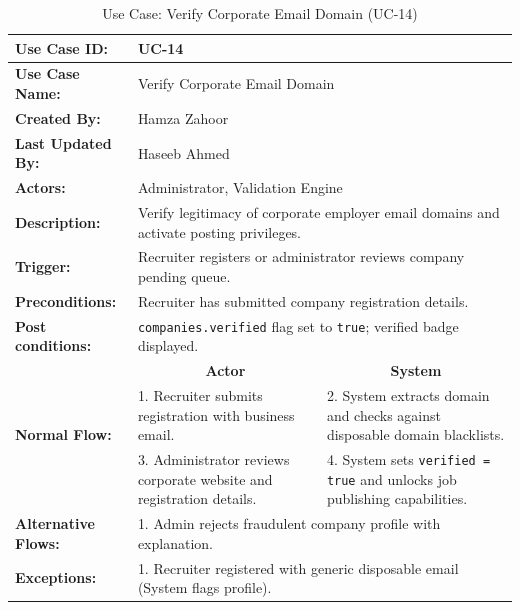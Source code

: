 \begin{table}[H]
\centering
\small
\caption{Use Case: Verify Corporate Email Domain (UC-14)}
\label{tab:uc14_spec}
\begin{tabular}{|p{3.2cm}|p{5.5cm}|p{5.5cm}|}
\hline
\textbf{Use Case ID:} & \multicolumn{2}{p{11.4cm}|}{UC-14} \\ \hline
\textbf{Use Case Name:} & \multicolumn{2}{p{11.4cm}|}{Verify Corporate Email Domain} \\ \hline
\textbf{Created By:} & \multicolumn{2}{p{11.4cm}|}{Hamza Zahoor} \\ \hline
\textbf{Last Updated By:} & \multicolumn{2}{p{11.4cm}|}{Haseeb Ahmed} \\ \hline
\textbf{Actors:} & \multicolumn{2}{p{11.4cm}|}{Administrator, Validation Engine} \\ \hline
\textbf{Description:} & \multicolumn{2}{p{11.4cm}|}{Verify legitimacy of corporate employer email domains and activate posting privileges.} \\ \hline
\textbf{Trigger:} & \multicolumn{2}{p{11.4cm}|}{Recruiter registers or administrator reviews company pending queue.} \\ \hline
\textbf{Preconditions:} & \multicolumn{2}{p{11.4cm}|}{Recruiter has submitted company registration details.} \\ \hline
\textbf{Post conditions:} & \multicolumn{2}{p{11.4cm}|}{\texttt{companies.verified} flag set to \texttt{true}; verified badge displayed.} \\ \hline
\multirow{3}{*}{\textbf{Normal Flow:}} & \multicolumn{1}{c|}{\textbf{Actor}} & \multicolumn{1}{c|}{\textbf{System}} \\ \cline{2-3}
& 1. Recruiter submits registration with business email. & 2. System extracts domain and checks against disposable domain blacklists. \vspace{2pt} \\
& 3. Administrator reviews corporate website and registration details. & 4. System sets \texttt{verified = true} and unlocks job publishing capabilities. \\ \hline
\textbf{Alternative Flows:} & \multicolumn{2}{p{11.4cm}|}{1. Admin rejects fraudulent company profile with explanation.} \\ \hline
\textbf{Exceptions:} & \multicolumn{2}{p{11.4cm}|}{1. Recruiter registered with generic disposable email (System flags profile).} \\ \hline
\end{tabular}
\end{table}

